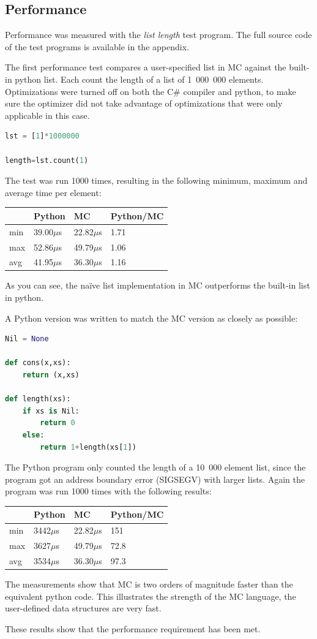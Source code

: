 \subsection{Performance}

Performance was measured with the \textit{list length} test program.
The full source code of the test programs is available in the appendix.

The first performance test compares a user-specified list in MC against the built-in python list.
Each count the length of a list of 1~000~000 elements.
Optimizations were turned off on both the C\# compiler and python, to make sure the optimizer did not take advantage of optimizations that were only applicable in this case.

\begin{lstlisting}[language=python]
lst = [1]*1000000

length=lst.count(1)
\end{lstlisting}

The test was run 1000 times, resulting in the following minimum, maximum and average time per element:

\begin{tabular}{l|lll}
& Python & MC & Python/MC \\
\hline
min & 39.00$\mu$s & 22.82$\mu$s & 1.71 \\
max & 52.86$\mu$s & 49.79$\mu$s & 1.06 \\
avg & 41.95$\mu$s & 36.30$\mu$s & 1.16 \\
\end{tabular}

As you can see, the naïve list implementation in MC outperforms the built-in list in python.

A Python version was written to match the MC version as closely as possible:

\begin{lstlisting}[language=python]
Nil = None

def cons(x,xs):
    return (x,xs)

def length(xs):
    if xs is Nil:
        return 0
    else:
        return 1+length(xs[1])
\end{lstlisting}

The Python program only counted the length of a 10~000 element list, since the program got an address boundary error (SIGSEGV) with larger lists.
Again the program was run 1000 times with the following results:

\begin{tabular}{l|lll}
& Python & MC & Python/MC \\
\hline
min & 3442$\mu$s & 22.82$\mu$s & 151  \\
max & 3627$\mu$s & 49.79$\mu$s & 72.8 \\
avg & 3534$\mu$s & 36.30$\mu$s & 97.3 \\
\end{tabular}

The measurements show that MC is two orders of magnitude faster than the equivalent python code.
This illustrates the strength of the MC language, the user-defined data structures are very fast.

These results show that the performance requirement has been met.

